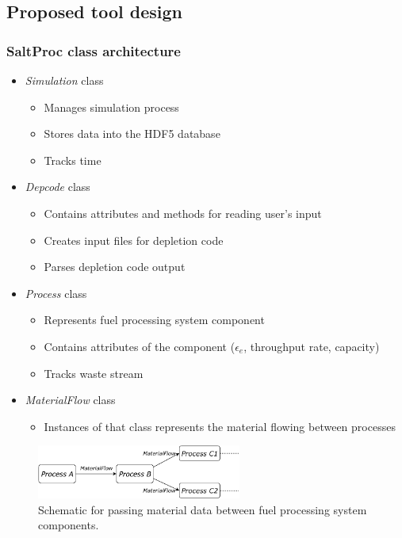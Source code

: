 \subsection{Proposed tool design}


\begin{frame}
\frametitle{SaltProc class architecture}
	\begin{itemize}
		\item \textit{Simulation} class
			\begin{itemize}
				\item Manages simulation process
				\item Stores data into the HDF5 database
				\item Tracks time
			\end{itemize}
		\item \textit{Depcode} class
			\begin{itemize}
				\item Contains attributes and methods for reading user's input
				\item Creates input files for depletion code
				\item Parses depletion code output 
			\end{itemize}
		\item \textit{Process} class
			\begin{itemize}
				\item Represents fuel processing system component
				\item Contains attributes of the component ($\epsilon_e$, throughput rate, capacity)
				\item Tracks waste stream
			\end{itemize}
		\item \textit{MaterialFlow} class
			\begin{itemize}
				\item Instances of that class represents the material flowing between processes
			\end{itemize}
	\end{itemize}
		\vspace{3mm}
	\begin{figure}[ht!] %
		\centering
		\includegraphics[width=0.6\textwidth]{../figures/materialflow.pdf}
		\vspace{-0.1in}
		\caption{Schematic for passing material data between fuel processing 
		system components.}
	\end{figure}

\end{frame}


